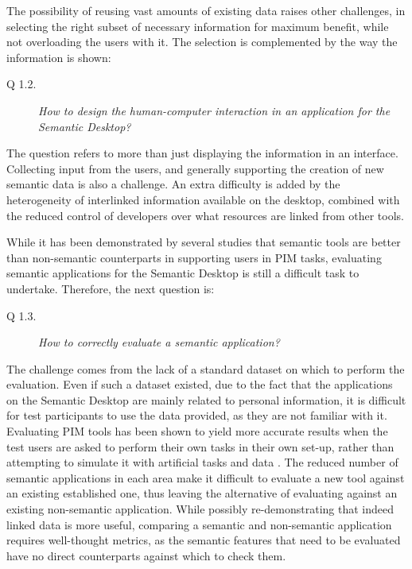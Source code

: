 The possibility of reusing vast amounts of existing data raises other challenges, in selecting the right subset of necessary information for maximum benefit, while not overloading the users with it. The selection is complemented by the way the information is shown:

\begin{description}
 \item[Q 1.2.] \emph{How to design the human-computer interaction in an application for the Semantic Desktop?}
\end{description}

The question refers to more than just displaying the information in an interface. Collecting input from the users, and generally supporting the creation of new semantic data is also a challenge. An extra difficulty is added by the heterogeneity of interlinked information available on the desktop, combined with the reduced control of developers over what resources are linked from other tools. 

While it has been demonstrated by several studies that semantic tools are better than non-semantic counterparts \cite{Sauermann2008,Franz2009} in supporting users in PIM tasks, evaluating semantic applications for the Semantic Desktop is still a difficult task to undertake. Therefore, the next question is: 

\begin{description}
 \item[Q 1.3.] \emph{How to correctly evaluate a semantic application?}
\end{description}

The challenge comes from the lack of a standard dataset on which to perform the evaluation. Even if such a dataset existed, due to the fact that the applications on the Semantic Desktop are mainly related to personal information, it is difficult for test participants to use the data provided, as they are not familiar with it. Evaluating PIM tools has been shown to yield more accurate results when the test users are asked to perform their own tasks in their own set-up, rather than attempting to simulate it with artificial tasks and data \cite{Kelly2006}. The reduced number of semantic applications in each area make it difficult to evaluate a new tool against an existing established one, thus leaving the alternative of evaluating against an existing non-semantic application. While possibly re-demonstrating that indeed linked data is more useful, comparing a semantic and non-semantic application requires well-thought metrics, as the semantic features that need to be evaluated have no direct counterparts against 
which to check them.


